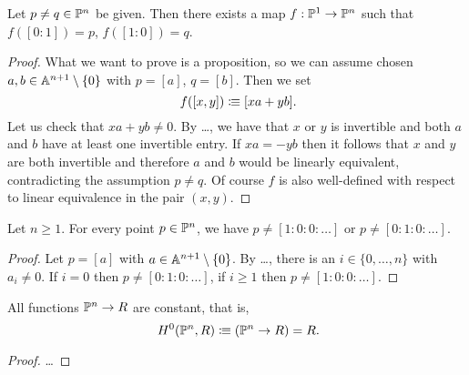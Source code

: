 \begin{lemma}
  Let $p \neq q \in \mathbb{P}^n$ be given.
  Then there exists a map $f : \mathbb{P}^1 \to \mathbb{P}^n$
  such that $f([0 : 1]) = p$, $f([1 : 0]) = q$.
\end{lemma}

\begin{proof}
  What we want to prove is a proposition,
  so we can assume chosen $a, b \in \mathbb{A}^{n+1} \setminus \{0\}$
  with $p = [a]$, $q = [b]$.
  Then we set
  \[ f([x, y]) \colonequiv [xa + yb] \rlap{.}\]
  Let us check that $xa + yb \neq 0$.
  By \dots,
  we have that $x$ or $y$ is invertible
  and both $a$ and $b$ have at least one invertible entry.
  If $xa = - yb$
  then it follows that $x$ and $y$ are both invertible
  and therefore $a$ and $b$ would be linearly equivalent,
  contradicting the assumption $p \neq q$.
  Of course $f$ is also well-defined
  with respect to linear equivalence in the pair $(x, y)$.
\end{proof}

\begin{lemma}
  Let $n \geq 1$.
  For every point $p \in \mathbb{P}^n$,
  we have $p \neq [1 : 0 : 0 : \dots]$
  or $p \neq [0 : 1 : 0 : \dots]$.
\end{lemma}

\begin{proof}
  Let $p = [a]$ with $a \in \mathbb{A}^{n+1} \setminus \{0\}$.
  By \dots,
  there is an $i \in \{0, \dots, n\}$ with $a_i \neq 0$.
  If $i = 0$ then $p \neq [0 : 1 : 0 : \dots]$,
  if $i \geq 1$ then $p \neq [1 : 0 : 0 : \dots]$.
\end{proof}

\begin{theorem}
  All functions $\mathbb{P}^n \to R$ are constant,
  that is,
  \[ H^0(\bP^n, R) \colonequiv (\bP^n \to R) = R \rlap{.} \]
\end{theorem}

\begin{proof}
  \dots
\end{proof}
